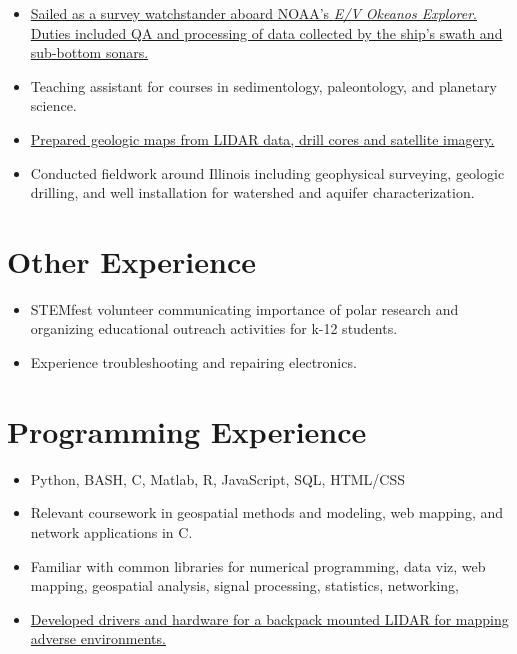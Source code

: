 \documentclass{cv_TOH}
\begin{document}
\begin{itemize}
\item \href{http://www.niutoday.info/2014/04/17/niu-student-lands-coveted-internship-aboard-exploration-ship/}
  {Sailed as a survey watchstander aboard NOAA's \textit{E/V Okeanos Explorer}.
  Duties included QA and processing of data collected by the ship's swath and sub-bottom sonars.}
\end{itemize}

\begin{itemize}
\item Teaching assistant for courses in sedimentology, paleontology, and planetary science.
\end{itemize}

\begin{itemize}
\item \href{http://www.isgs.illinois.edu/sites/isgs/files/maps/isgs-quads/aurora-south-sg.pdf}{Prepared geologic maps from LIDAR data, drill cores and satellite imagery.}
\item Conducted fieldwork around Illinois including geophysical surveying, geologic drilling, and well installation for watershed and aquifer characterization. 
\end{itemize}

\section{Other Experience}
\begin{itemize}
\item STEMfest volunteer communicating importance of polar research and organizing educational outreach activities for k-12 students.
\item Experience troubleshooting and repairing electronics.
\end{itemize}

\section{Programming Experience}
\begin{itemize}
\item Python, BASH, C, Matlab, R, JavaScript, SQL, HTML/CSS
\item Relevant coursework in geospatial methods and modeling, web mapping, and network applications in C.
\item Familiar with common libraries for numerical programming, data viz,
  web mapping, geospatial analysis, signal processing, statistics, networking, 
\item \href{https://github.com/tohodson/velodyne_tools}{Developed drivers and hardware for a backpack mounted LIDAR for mapping adverse environments.}
\end{itemize}
\end{document}
